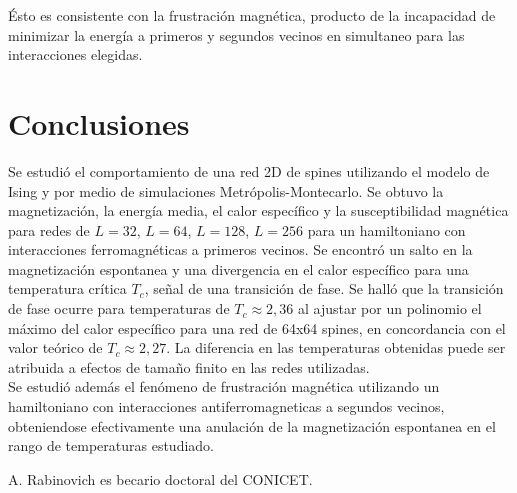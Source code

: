 \documentclass[%
 reprint,
 amsmath,amssymb,
 aps,
spanish]{revtex4-1}
\begin{document}
Ésto es consistente con la frustración magnética, producto de la incapacidad de minimizar la energía a primeros y segundos vecinos en simultaneo para las interacciones elegidas. 

\section{Conclusiones}
Se estudió el comportamiento de una red 2D de spines utilizando el modelo de Ising y por medio de simulaciones Metrópolis-Montecarlo. Se obtuvo la magnetización, la energía media, el calor específico 
y la susceptibilidad magnética para redes de $L=32$, $L=64$, $L=128$, $L=256$ para un hamiltoniano con interacciones ferromagnéticas a primeros vecinos. Se encontró un salto en la magnetización 
espontanea y una divergencia en el calor específico para una temperatura crítica $T_c$, señal de una transición de fase. Se halló que la transición de fase ocurre para temperaturas de 
$T_c\approx2,36$ al ajustar por un polinomio el máximo del calor específico para una red de 64x64 spines, en concordancia con el valor teórico de $T_c\approx2,27$. La diferencia en las temperaturas 
obtenidas puede ser atribuida a efectos de tamaño finito en las redes utilizadas.\\
Se estudió además el fenómeno de frustración magnética utilizando un hamiltoniano con interacciones antiferromagneticas a segundos vecinos, obteniendose efectivamente una anulación de la 
magnetización espontanea en el rango de temperaturas estudiado.

\begin{acknowledgments}
A. Rabinovich es becario doctoral del CONICET. 
\end{acknowledgments}

\appendix
\end{document}
